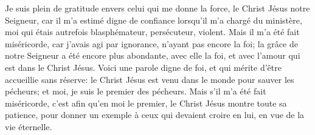 Je suis plein de gratitude envers celui qui me donne la force,
	le Christ Jésus notre Seigneur,
	car il m’a estimé digne de confiance lorsqu’il m’a chargé du ministère,
	moi qui étais autrefois blasphémateur, persécuteur, violent.
Mais il m’a été fait miséricorde,
	car j’avais agi par ignorance, n’ayant pas encore la foi;
	la grâce de notre Seigneur a été encore plus abondante,
	avec elle la foi, et avec l’amour qui est dans le Christ Jésus.
Voici une parole digne de foi, et qui mérite d’être accueillie sans réserve:
	le Christ Jésus est venu dans le monde pour sauver les pécheurs;
	et moi, je suis le premier des pécheurs.
Mais s’il m’a été fait miséricorde,
	c’est afin qu’en moi le premier, le Christ Jésus montre toute sa patience,
	pour donner un exemple à ceux qui devaient croire en lui, en vue de la vie éternelle.
